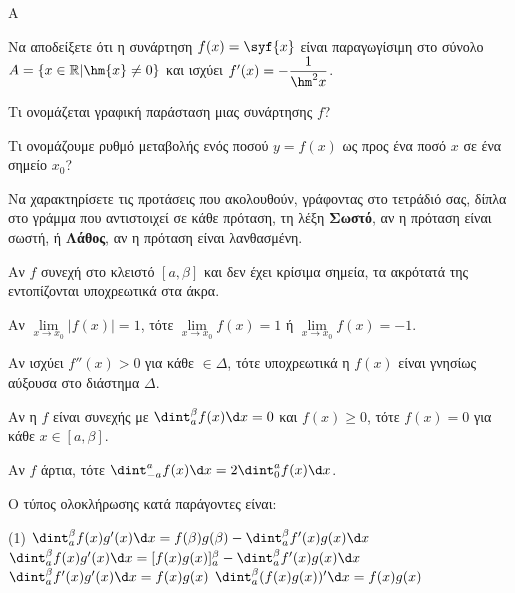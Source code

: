 \begin{thema}{A}
\begin{erwthma}
    \item Να αποδείξετε ότι η συνάρτηση $ f(x)=\syf{x} $ είναι παραγωγίσιμη στο σύνολο $ A=\{x\in\mathbb{R}|\hm{x}\neq 0\} $ και ισχύει $ f'(x)=-\dfrac{1}{\hm^2{x}} $.
    \item Τι ονομάζεται γραφική παράσταση μιας συνάρτησης $f$?
    \item Τι ονομάζουμε ρυθμό μεταβολής ενός ποσού $y=f(x)$ ως προς ένα ποσό $x$ σε ένα σημείο $x_0$?
    \item Να χαρακτηρίσετε τις προτάσεις που ακολουθούν, γράφοντας στο τετράδιό σας, δίπλα στο γράμμα που αντιστοιχεί σε κάθε πρόταση, τη λέξη \textbf{Σωστό}, αν η πρόταση είναι σωστή, ή \textbf{Λάθος}, αν η πρόταση είναι λανθασμένη.
    \begin{alist}
        \item Αν $f$ συνεχή στο κλειστό $[a, \beta]$ και δεν έχει κρίσιμα σημεία, τα ακρότατά της εντοπίζονται υποχρεωτικά στα άκρα.
        \item Αν $\lim\limits_{x\to x_0} |f(x)| = 1$, τότε $\lim\limits_{x\to x_0} f(x) = 1$ ή $\lim\limits_{x\to x_0} f(x) = -1$.
        \item Αν ισχύει $f''(x) > 0$ για κάθε $\in\varDelta$, τότε υποχρεωτικά η $f(x)$ είναι γνησίως αύξουσα στο διάστημα $\varDelta$.
        \item Αν η $f$ είναι συνεχής με $\dint_a^\beta f(x) \d x = 0$ και $f(x) \ge 0$, τότε $f(x) = 0$ για κάθε $x \in [a, \beta]$.
        \item Αν $f$ άρτια, τότε $\dint_{-a}^a f(x) \d x = 2 \dint_0^a f(x) \d x$.
    \end{alist}
    \item Ο τύπος ολοκλήρωσης κατά παράγοντες είναι:
    \begin{tasks}[label=\let\textdexiakeraia\relax\alph*.](1)
        \task $\dint_a^\beta f(x)g'(x) \d x = f(\beta)g(\beta) - \dint_a^\beta f'(x)g(x) \d x$
        \task $\dint_a^\beta f(x)g'(x) \d x = [f(x)g(x)]_a^\beta - \dint_a^\beta f'(x)g(x) \d x$
        \task $\dint_a^\beta f'(x)g'(x) \d x = f(x)g(x)$
        \task $\dint_a^\beta (f(x)g(x))' \d x = f(x) g(x)$
    \end{tasks}
\end{erwthma}
\end{thema}
